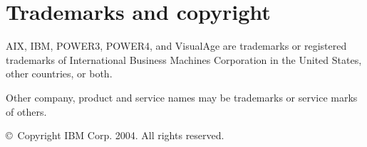 
\section{Trademarks and copyright}

AIX, IBM, POWER3, POWER4, and VisualAge are trademarks or registered
trademarks of International Business Machines Corporation in the
United States, other countries, or both.

\noindent Other company, product and service names may be trademarks or service
marks of others.
  

\noindent \copyright\ Copyright IBM Corp. 2004.  All rights reserved.


